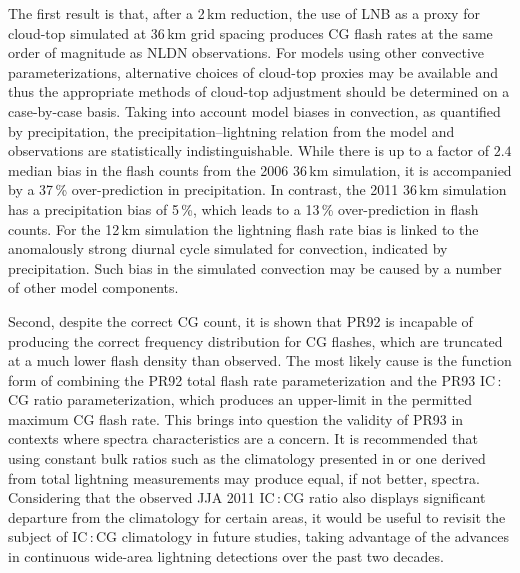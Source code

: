 The first result is that, after a 2\,\unit{km} reduction, the use of LNB as a
proxy for cloud-top simulated at 36\,\unit{km} grid spacing produces CG flash
rates at the same order of magnitude as NLDN observations. For models using
other convective parameterizations, alternative choices of cloud-top proxies
may be available and thus the appropriate methods of cloud-top adjustment
should be determined on a case-by-case basis. Taking into account model
biases in convection, as quantified by precipitation, the
precipitation--lightning relation from the model and observations are
statistically indistinguishable. While there is up to a factor of $2.4$
median bias in the flash counts from the 2006 36\,\unit{km} simulation, it is
accompanied by a 37\,{\%} over-prediction in precipitation. In contrast, the
2011 36\,\unit{km} simulation has a precipitation bias of 5\,{\%}, which
leads to a 13\,{\%} over-prediction in flash counts. For the 12\,\unit{km}
simulation the lightning flash rate bias is linked to the anomalously strong
diurnal cycle simulated for convection, indicated by precipitation. Such bias
in the simulated convection may be caused by a number of other model
components.

Second, despite the correct CG count, it is shown that PR92 is incapable of
producing the correct frequency distribution for CG flashes, which are
truncated at a much lower flash density than observed. The most likely cause
is the function form of combining the PR92 total flash rate parameterization
and the PR93 IC\,:\,CG ratio parameterization, which produces an upper-limit
in the permitted maximum CG flash rate. This brings into question the
validity of PR93 in contexts where spectra characteristics are a concern. It
is recommended that using constant bulk ratios such as the climatology
presented in \citet{Boccippio:2001ys} or one derived from total lightning
measurements may produce equal, if not better, spectra. Considering that the
observed JJA 2011 IC\,:\,CG ratio also displays significant departure from
the \citet{Boccippio:2001ys} climatology for certain areas, it would be
useful to revisit the subject of IC\,:\,CG climatology in future studies,
taking
advantage of the advances in continuous wide-area lightning detections over
the past two decades.

